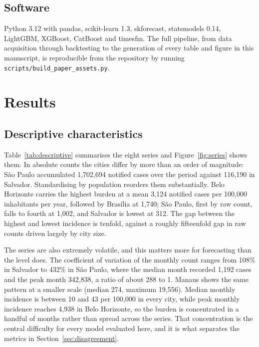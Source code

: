 \documentclass[11pt]{article}
\begin{document}
\subsection{Software}

Python 3.12 with pandas, scikit-learn 1.3, skforecast, statsmodels 0.14, LightGBM,
XGBoost, CatBoost and timesfm. The full pipeline, from data acquisition through
backtesting to the generation of every table and figure in this manuscript, is
reproducible from the repository by running \texttt{scripts/build\_paper\_assets.py}.

\section{Results}

\subsection{Descriptive characteristics}

Table~\ref{tab:descriptive} summarises the eight series and Figure~\ref{fig:series} shows
them. In absolute counts the cities differ by more than an order of magnitude: S\~ao
Paulo accumulated 1{,}702{,}694 notified cases over the period against 116{,}190 in
Salvador. Standardising by population reorders them substantially. Belo Horizonte carries
the highest burden at a mean 3{,}124 notified cases per 100{,}000 inhabitants per year,
followed by Bras\'ilia at 1{,}740; S\~ao Paulo, first by raw count, falls to fourth at
1{,}002, and Salvador is lowest at 312. The gap between the highest and lowest incidence
is tenfold, against a roughly fifteenfold gap in raw counts driven largely by city size.

The series are also extremely volatile, and this matters more for forecasting than the
level does. The coefficient of variation of the monthly count ranges from 108\% in
Salvador to 432\% in S\~ao Paulo, where the median month recorded 1{,}192 cases and the
peak month 342{,}838, a ratio of about 288 to 1. Manaus shows the same pattern at a
smaller scale (median 274, maximum 19{,}556). Median monthly incidence is between 10 and
43 per 100{,}000 in every city, while peak monthly incidence reaches 4{,}938 in Belo
Horizonte, so the burden is concentrated in a handful of months rather than spread across
the series. That concentration is the central difficulty for every model evaluated here,
and it is what separates the metrics in Section~\ref{sec:disagreement}.
\end{document}
